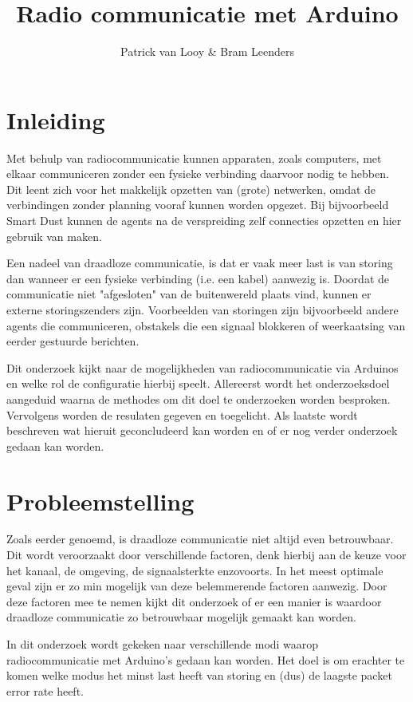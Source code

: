 \documentclass[a4paper,10pt]{article}
\title{Radio communicatie met Arduino}
\author{Patrick van Looy \& Bram Leenders}
\begin{document}
\maketitle

\section{Inleiding}
Met behulp van radiocommunicatie kunnen apparaten, zoals computers, met elkaar communiceren zonder een fysieke verbinding daarvoor nodig te hebben. Dit leent zich voor het makkelijk opzetten van (grote) netwerken, omdat de verbindingen zonder planning vooraf kunnen worden opgezet. Bij bijvoorbeeld Smart Dust kunnen de agents na de verspreiding zelf connecties opzetten en hier gebruik van maken.

Een nadeel van draadloze communicatie, is dat er vaak meer last is van storing dan wanneer er een fysieke verbinding (i.e. een kabel) aanwezig is. Doordat de communicatie niet "afgesloten" van de buitenwereld plaats vind, kunnen er externe storingszenders zijn. Voorbeelden van storingen zijn bijvoorbeeld andere agents die communiceren, obstakels die een signaal blokkeren of weerkaatsing van eerder gestuurde berichten.

Dit onderzoek kijkt naar de mogelijkheden van radiocommunicatie via Arduinos en welke rol de configuratie hierbij speelt. Allereerst wordt het onderzoeksdoel aangeduid waarna de methodes om dit doel te onderzoeken worden besproken. Vervolgens worden de resulaten gegeven en toegelicht. Als laatste wordt beschreven wat hieruit geconcludeerd kan worden en of er nog verder onderzoek gedaan kan worden.

\section{Probleemstelling}
Zoals eerder genoemd, is draadloze communicatie niet altijd even betrouwbaar. Dit wordt veroorzaakt door verschillende factoren, denk hierbij aan de keuze voor het kanaal, de omgeving, de signaalsterkte enzovoorts. In het meest optimale geval zijn er zo min mogelijk van deze belemmerende factoren aanwezig. Door deze factoren mee te nemen kijkt dit onderzoek of er een manier is waardoor draadloze communicatie zo betrouwbaar mogelijk gemaakt kan worden.

In dit onderzoek wordt gekeken naar verschillende modi waarop radiocommunicatie met Arduino's gedaan kan worden. Het doel is om erachter te komen welke modus het minst last heeft van storing en (dus) de laagste packet error rate heeft.
\end{document}
